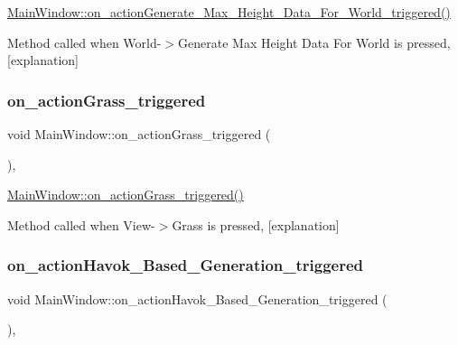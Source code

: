 \hyperlink{class_main_window_af239e60413e6c76eb2dcf61cb088e30a}{Main\+Window\+::on\+\_\+action\+Generate\+\_\+\+Max\+\_\+\+Height\+\_\+\+Data\+\_\+\+For\+\_\+\+World\+\_\+triggered()} 

Method called when World-\/$>$Generate Max Height Data For World is pressed, \mbox{[}explanation\mbox{]} \mbox{\label{class_main_window_ac2ff07ecfb39bbcd9f863693bd3bb146}} 
\subsubsection{\texorpdfstring{on\+\_\+action\+Grass\+\_\+triggered}{on\_actionGrass\_triggered}}
{\footnotesize\ttfamily void Main\+Window\+::on\+\_\+action\+Grass\+\_\+triggered (\begin{DoxyParamCaption}{ }\end{DoxyParamCaption})\hspace{0.3cm}{\ttfamily [private]}, {\ttfamily [slot]}}



\hyperlink{class_main_window_ac2ff07ecfb39bbcd9f863693bd3bb146}{Main\+Window\+::on\+\_\+action\+Grass\+\_\+triggered()} 

Method called when View-\/$>$Grass is pressed, \mbox{[}explanation\mbox{]} \mbox{\label{class_main_window_acce573c1ebbc822a6008c05377a4f431}} 
\subsubsection{\texorpdfstring{on\+\_\+action\+Havok\+\_\+\+Based\+\_\+\+Generation\+\_\+triggered}{on\_actionHavok\_Based\_Generation\_triggered}}
{\footnotesize\ttfamily void Main\+Window\+::on\+\_\+action\+Havok\+\_\+\+Based\+\_\+\+Generation\+\_\+triggered (\begin{DoxyParamCaption}{ }\end{DoxyParamCaption})\hspace{0.3cm}{\ttfamily [private]}, {\ttfamily [slot]}}



